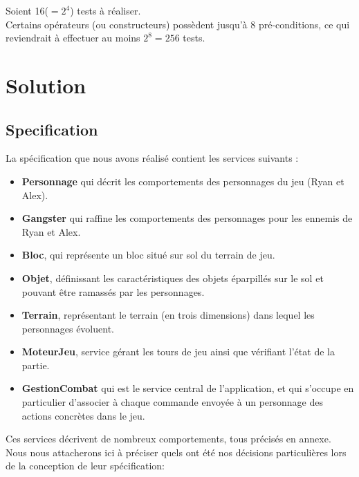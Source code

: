 \documentclass[a4paper, 11pt, notitlepage]{article}
\begin{document}
Soient 16($=2^4$) tests à réaliser.  \\

Certains opérateurs (ou constructeurs) possèdent jusqu'à 8 pré-conditions, ce qui reviendrait à effectuer au moins $2^8=256$ tests. \\





\section{Solution}



\subsection{Specification}

La spécification que nous avons réalisé contient les services suivants : 

\begin{itemize}
\item \textbf{Personnage} qui décrit les comportements des personnages du jeu (Ryan et Alex).
\item \textbf{Gangster} qui raffine les comportements des personnages pour les ennemis de Ryan et Alex.
\item \textbf{Bloc}, qui représente un bloc situé sur sol du terrain de jeu.
\item \textbf{Objet}, définissant les caractéristiques des objets éparpillés sur le sol et pouvant être ramassés par les personnages.
\item \textbf{Terrain}, représentant le terrain (en trois dimensions) dans lequel les personnages évoluent.
\item \textbf{MoteurJeu}, service gérant les tours de jeu ainsi que vérifiant l'état de la partie.
\item \textbf{GestionCombat} qui est le service central de l'application, et qui s'occupe en particulier d'associer à chaque commande envoyée à un personnage des actions concrètes dans le jeu. \\
\end{itemize}

Ces services décrivent de nombreux comportements, tous précisés en annexe. Nous nous attacherons ici à préciser quels ont été nos décisions particulières lors de la conception de leur spécification: \\
\end{document}

